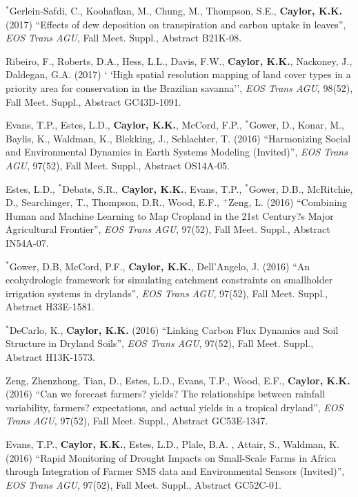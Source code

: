 \documentclass[10pt]{article}
\begin{document}
\begin{etaremune}
\item $^{*}$Gerlein-Safdi, C., Koohafkan, M., Chung, M., Thompson, S.E., \textbf{Caylor, K.K.} (2017) ``Effects of dew deposition on transpiration and carbon uptake in leaves'', \emph{EOS Trans AGU}, Fall Meet. Suppl., Abstract B21K-08.

\item  Ribeiro, F., Roberts, D.A., Hess, L.L., Davis, F.W.,  \textbf{Caylor, K.K.}, Nackoney, J., Daldegan, G.A. (2017) `	`High spatial resolution mapping of land cover types in a priority area for conservation in the Brazilian savanna'', \emph{EOS Trans AGU}, 98(52), Fall Meet. Suppl., Abstract GC43D-1091.
 
\item Evans, T.P., Estes, L.D., \textbf{Caylor, K.K.},  McCord, F.P., $^{*}$Gower, D., Konar, M., Baylis, K., Waldman, K., Blekking, J., Schlachter, T. (2016) ``Harmonizing Social and Environmental Dynamics in Earth Systems Modeling (Invited)'', \emph{EOS Trans AGU}, 97(52), Fall Meet. Suppl., Abstract OS14A-05.

\item Estes, L.D., $^{*}$Debats, S.R., \textbf{Caylor, K.K.}, Evans, T.P., $^{*}$Gower, D.B.,  McRitchie, D., Searchinger, T., Thompson, D.R., Wood, E.F., $^{+}$Zeng, L. (2016) ``Combining Human and Machine Learning to Map Cropland in the 21st Century?s Major Agricultural Frontier'', \emph{EOS Trans AGU}, 97(52), Fall Meet. Suppl., Abstract IN54A-07.

\item $^{*}$Gower, D.B, McCord, P.F., \textbf{Caylor, K.K.}, Dell'Angelo, J. (2016) ``An ecohydrologic framework for simulating catchment constraints on smallholder irrigation systems in drylands'',  \emph{EOS Trans AGU}, 97(52), Fall Meet. Suppl., Abstract H33E-1581. 

\item $^{*}$DeCarlo, K.,  \textbf{Caylor, K.K.} (2016) ``Linking Carbon Flux Dynamics and Soil Structure in Dryland Soils'', \emph{EOS Trans AGU}, 97(52), Fall Meet. Suppl., Abstract H13K-1573.

\item Zeng, Zhenzhong, Tian, D., Estes, L.D., Evans, T.P., Wood, E.F., \textbf{Caylor, K.K.} (2016) ``Can we forecast farmers? yields? The relationships between rainfall variability, farmers? expectations, and actual yields in a tropical dryland'', \emph{EOS Trans AGU}, 97(52), Fall Meet. Suppl., Abstract GC53E-1347.

\item Evans, T.P.,  \textbf{Caylor, K.K.}, Estes, L.D., Plale, B.A. , Attair, S., Waldman, K. (2016) ``Rapid Monitoring of Drought Impacts on Small-Scale Farms in Africa through Integration of Farmer SMS data and Environmental Sensors (Invited)'',  \emph{EOS Trans AGU}, 97(52), Fall Meet. Suppl., Abstract GC52C-01.


\end{etaremune}
\end{document}
